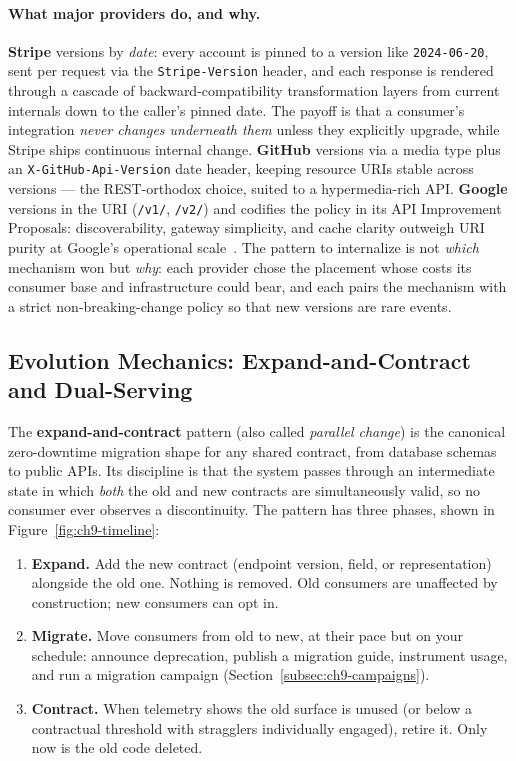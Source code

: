 \paragraph{What major providers do, and why.}
\textbf{Stripe} versions by \emph{date}: every account is pinned to a version
like \texttt{2024-06-20}, sent per request via the \texttt{Stripe-Version}
header, and each response is rendered through a cascade of
backward-compatibility transformation layers from current internals down to
the caller's pinned date. The payoff is that a consumer's integration
\emph{never changes underneath them} unless they explicitly upgrade, while
Stripe ships continuous internal change. \textbf{GitHub} versions via a media
type plus an \texttt{X-GitHub-Api-Version} date header, keeping resource URIs
stable across versions --- the REST-orthodox choice, suited to a
hypermedia-rich API. \textbf{Google} versions in the URI (\texttt{/v1/},
\texttt{/v2/}) and codifies the policy in its API Improvement Proposals:
discoverability, gateway simplicity, and cache clarity outweigh URI purity at
Google's operational scale~\cite{gehl2021apidesign}. The pattern to
internalize is not \emph{which} mechanism won but \emph{why}: each provider
chose the placement whose costs its consumer base and infrastructure could
bear, and each pairs the mechanism with a strict non-breaking-change policy
so that new versions are rare events.

\subsection{Evolution Mechanics: Expand-and-Contract and Dual-Serving}
\label{subsec:ch9-expandcontract}

The \textbf{expand-and-contract} pattern (also called \emph{parallel change})
is the canonical zero-downtime migration shape for any shared contract, from
database schemas~\cite{kleppmann2017ddia} to public APIs. Its discipline is
that the system passes through an intermediate state in which \emph{both} the
old and new contracts are simultaneously valid, so no consumer ever observes
a discontinuity. The pattern has three phases, shown in
Figure~\ref{fig:ch9-timeline}:

\begin{enumerate}
  \item \textbf{Expand.} Add the new contract (endpoint version, field, or
        representation) alongside the old one. Nothing is removed. Old
        consumers are unaffected by construction; new consumers can opt in.
  \item \textbf{Migrate.} Move consumers from old to new, at their pace but
        on your schedule: announce deprecation, publish a migration guide,
        instrument usage, and run a migration campaign
        (Section~\ref{subsec:ch9-campaigns}).
  \item \textbf{Contract.} When telemetry shows the old surface is unused (or
        below a contractual threshold with stragglers individually engaged),
        retire it. Only now is the old code deleted.
\end{enumerate}

